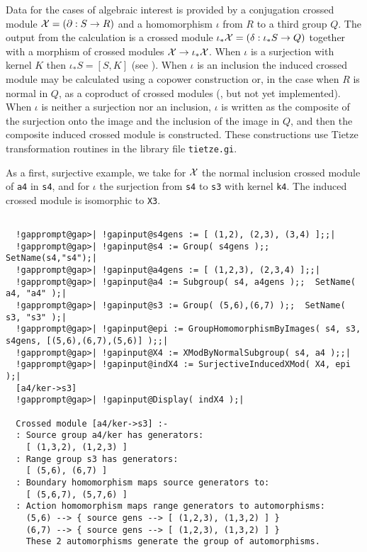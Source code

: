 \documentclass[a4paper,11pt]{report}
\begin{document}
{{{ Data for the cases of algebraic interest is provided by a conjugation crossed
module ${\cal X} = (\partial : S \to R)$ and a homomorphism $\iota$ from $R$ to a third group $Q$. The output from the calculation is a crossed module $\iota_{\ast}{\cal X} = (\delta : \iota_{\ast}S \to Q)$ together with a morphism of crossed modules ${\cal X} \to \iota_{\ast}{\cal X}$. When $\iota$ is a surjection with kernel $K$ then $\iota_{\ast}S = [S,K]$ (see \cite{BH1}). When $\iota$ is an inclusion the induced crossed module may be calculated using a copower
construction \cite{BW1} or, in the case when $R$ is normal in $Q$, as a coproduct of crossed modules (\cite{BW2}, but not yet implemented). When $\iota$ is neither a surjection nor an inclusion, $\iota$ is written as the composite of the surjection onto the image and the inclusion
of the image in $Q$, and then the composite induced crossed module is constructed. These
constructions use Tietze transformation routines in the library file \texttt{tietze.gi}. 

 As a first, surjective example, we take for ${\cal X}$ the normal inclusion crossed module of \texttt{a4} in \texttt{s4}, and for $\iota$ the surjection from \texttt{s4} to \texttt{s3} with kernel \texttt{k4}. The induced crossed module is isomorphic to \texttt{X3}. }

 
\begin{Verbatim}[commandchars=!@|,fontsize=\small,frame=single,label=Example]
  
  !gapprompt@gap>| !gapinput@s4gens := [ (1,2), (2,3), (3,4) ];;|
  !gapprompt@gap>| !gapinput@s4 := Group( s4gens );; SetName(s4,"s4");|
  !gapprompt@gap>| !gapinput@a4gens := [ (1,2,3), (2,3,4) ];;|
  !gapprompt@gap>| !gapinput@a4 := Subgroup( s4, a4gens );;  SetName( a4, "a4" );|
  !gapprompt@gap>| !gapinput@s3 := Group( (5,6),(6,7) );;  SetName( s3, "s3" );|
  !gapprompt@gap>| !gapinput@epi := GroupHomomorphismByImages( s4, s3, s4gens, [(5,6),(6,7),(5,6)] );;|
  !gapprompt@gap>| !gapinput@X4 := XModByNormalSubgroup( s4, a4 );;|
  !gapprompt@gap>| !gapinput@indX4 := SurjectiveInducedXMod( X4, epi );|
  [a4/ker->s3]
  !gapprompt@gap>| !gapinput@Display( indX4 );|
  
  Crossed module [a4/ker->s3] :- 
  : Source group a4/ker has generators:
    [ (1,3,2), (1,2,3) ]
  : Range group s3 has generators:
    [ (5,6), (6,7) ]
  : Boundary homomorphism maps source generators to:
    [ (5,6,7), (5,7,6) ]
  : Action homomorphism maps range generators to automorphisms:
    (5,6) --> { source gens --> [ (1,2,3), (1,3,2) ] }
    (6,7) --> { source gens --> [ (1,2,3), (1,3,2) ] }
    These 2 automorphisms generate the group of automorphisms.
  

\end{Verbatim}}}
\end{document}
